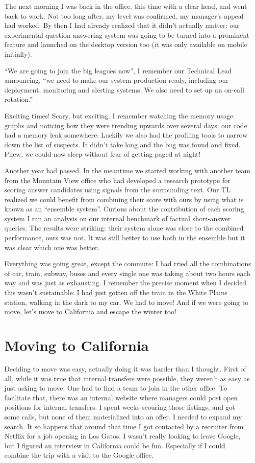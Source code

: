 \documentclass[12pt]{book}
\begin{document}
The next morning I was back in the office, this time with a clear head,
and went back to work. Not too long after, my level was confirmed, my
manager's appeal had worked. By then I had already realized that it
didn't actually matter: our experimental question answering system was
going to be turned into a prominent feature and launched on the desktop
version too (it was only available on mobile initially).

``We are going to join the big leagues now'', I remember our Technical
Lead announcing, ``we need to make our system production-ready,
including our deployment, monitoring and alerting systems. We also need
to set up an on-call rotation.''

Exciting times! Scary, but exciting. I remember watching the memory
usage graphs and noticing how they were trending upwards over several
days: our code had a memory leak somewhere. Luckily we also had the
profiling tools to narrow down the list of suspects. It didn't take long
and the bug was found and fixed. Phew, we could now sleep without fear
of getting paged at night!

Another year had passed. In the meantime we started working with another
team from the Mountain View office who had developed a research
prototype for scoring answer candidates using signals from the
surrounding text. Our TL realized we could benefit from combining their
score with ours by using what is known as an ``ensemble system''.
Curious about the contribution of each scoring system I ran an analysis
on our internal benchmark of factual short-answer queries. The results
were striking: their system alone was close to the combined performance,
ours was not. It was still better to use both in the ensemble but it was
clear which one was better.

Everything was going great, except the commute: I had tried all the
combinations of car, train, subway, buses and every single one was
taking about two hours each way and was just as exhausting. I remember
the precise moment when I decided this wasn't sustainable: I had just
gotten off the train in the White Plains station, walking in the dark to
my car. We had to move! And if we were going to move, let's move to
California and escape the winter too!


\section{Moving to California}

Deciding to move was easy, actually doing it was harder than I thought.
First of all, while it was true that internal transfers were possible,
they weren't as easy as just asking to move. One had to find a team to
join in the other office. To facilitate that, there was an internal
website where managers could post open positions for internal transfers.
I spent weeks scouring those listings, and got some calls, but none of
them materialized into an offer. I needed to expand my search. It so
happens that around that time I got contacted by a recruiter from
Netflix for a job opening in Los Gatos. I wasn't really looking to leave
Google, but I figured an interview in California could be fun.
Especially if I could combine the trip with a visit to the Google
office.
\end{document}
